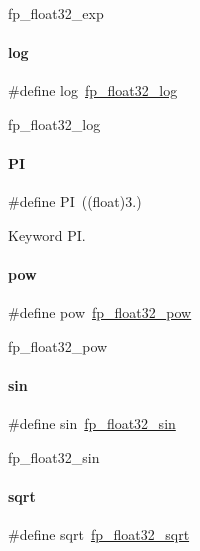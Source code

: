 fp\+\_\+float32\+\_\+exp \mbox{\label{a00023_a25274c13d478263ec5322541d7bbfeee}} 
\paragraph{\texorpdfstring{log}{log}}
{\footnotesize\ttfamily \#define log~\mbox{\hyperlink{a00023_a694db5e30e3f76718f29bacd4e044135}{fp\+\_\+float32\+\_\+log}}}

fp\+\_\+float32\+\_\+log \mbox{\label{a00023_a598a3330b3c21701223ee0ca14316eca}} 
\paragraph{\texorpdfstring{PI}{PI}}
{\footnotesize\ttfamily \#define PI~((float)3.)}

Keyword PI. \mbox{\label{a00023_a4b7fecf5b1bc24739831b0aaca6ffaf7}} 
\paragraph{\texorpdfstring{pow}{pow}}
{\footnotesize\ttfamily \#define pow~\mbox{\hyperlink{a00023_ac888f98a6e5d89837b647d2c81725836}{fp\+\_\+float32\+\_\+pow}}}

fp\+\_\+float32\+\_\+pow \mbox{\label{a00023_a28642ecbd9d1e77ab5a140a460f47d83}} 
\paragraph{\texorpdfstring{sin}{sin}}
{\footnotesize\ttfamily \#define sin~\mbox{\hyperlink{a00023_ae57383891f734bc754b6ade61fed3677}{fp\+\_\+float32\+\_\+sin}}}

fp\+\_\+float32\+\_\+sin \mbox{\label{a00023_aa8418f27fe28830a7fb62322463f15e0}} 
\paragraph{\texorpdfstring{sqrt}{sqrt}}
{\footnotesize\ttfamily \#define sqrt~\mbox{\hyperlink{a00023_a310b7eb83e737130e48a8d4b0853efd5}{fp\+\_\+float32\+\_\+sqrt}}}

